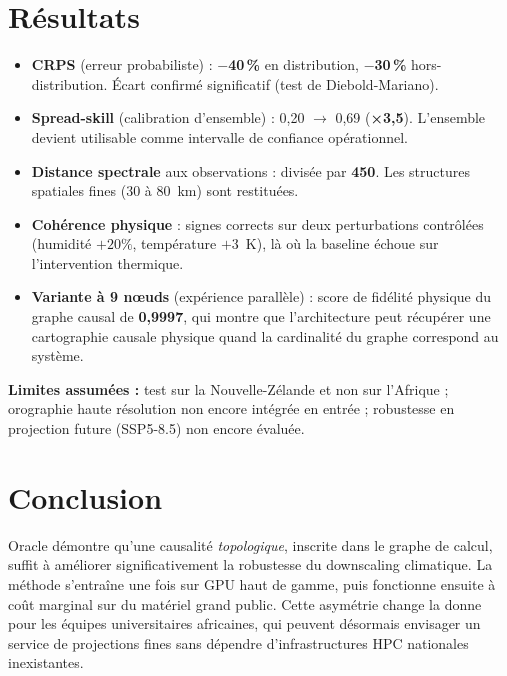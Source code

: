 \documentclass[14pt,a4paper]{extarticle}
\begin{document}
\section*{Résultats}
\begin{itemize}
    \item \textbf{CRPS} (erreur probabiliste) : \textbf{$-$40\,\%} en distribution, \textbf{$-$30\,\%} hors-distribution. Écart confirmé significatif (test de Diebold-Mariano).
    \item \textbf{Spread-skill} (calibration d'ensemble) : 0,20 $\rightarrow$ 0,69 (\textbf{×3,5}). L'ensemble devient utilisable comme intervalle de confiance opérationnel.
    \item \textbf{Distance spectrale} aux observations : divisée par \textbf{450}. Les structures spatiales fines (30 à 80~km) sont restituées.
    \item \textbf{Cohérence physique} : signes corrects sur deux perturbations contrôlées (humidité $+20\%$, température $+3$~K), là où la baseline échoue sur l'intervention thermique.
    \item \textbf{Variante à 9 nœuds} (expérience parallèle) : score de fidélité physique du graphe causal de \textbf{0,9997}, qui montre que l'architecture peut récupérer une cartographie causale physique quand la cardinalité du graphe correspond au système.
\end{itemize}

\textbf{Limites assumées :} test sur la Nouvelle-Zélande et non sur l'Afrique ; orographie haute résolution non encore intégrée en entrée ; robustesse en projection future (SSP5-8.5) non encore évaluée.

\section*{Conclusion}
Oracle démontre qu'une causalité \emph{topologique}, inscrite dans le graphe de calcul, suffit à améliorer significativement la robustesse du downscaling climatique. La méthode s'entraîne une fois sur GPU haut de gamme, puis fonctionne ensuite à coût marginal sur du matériel grand public. Cette asymétrie change la donne pour les équipes universitaires africaines, qui peuvent désormais envisager un service de projections fines sans dépendre d'infrastructures HPC nationales inexistantes.
\end{document}
